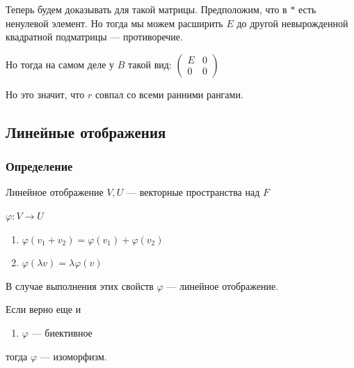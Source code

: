 Теперь будем доказывать для такой матрицы.
Предположим, что в \( * \) есть ненулевой элемент.
Но тогда мы можем расширить \( E \) до другой невырожденной квадратной подматрицы --- противоречие.

Но тогда на самом деле у \( B \) такой вид:
\(
    \begin{pmatrix}
        E & 0
        \\
        0 & 0
    \end{pmatrix}
\)

Но это значит, что \( r \) совпал со всеми ранними рангами.

\subsection{Линейные отображения}

\subsubsection{Определение}

\begin{defn}{Линейное отображение}{}
    \( V, U \) --- векторные пространства над \( F \)

    \( \varphi : V \to U \)

    \begin{enumerate}
        \item
            \( \varphi (v_1 + v_2) = \varphi (v_1) + \varphi (v_2) \)
        \item
            \( \varphi ( \lambda v ) = \lambda \varphi (v) \)
    \end{enumerate}

    В случае выполнения этих свойств \( \varphi \) --- линейное отображение.

    Если верно еще и
    \begin{enumerate}[start=3]
        \item
            \( \varphi \) --- биективное
    \end{enumerate}
    тогда \( \varphi \) --- изоморфизм.
\end{defn}

